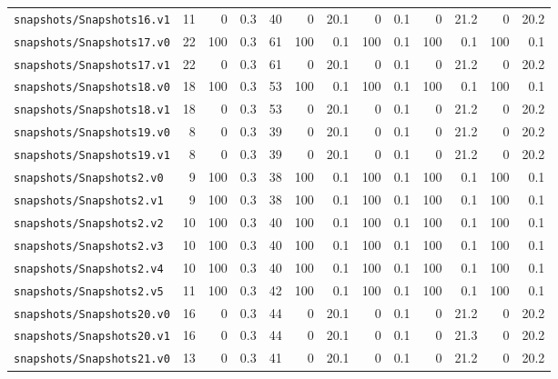 \documentclass[a4paper,final]{llncs}
\begin{document}
\begin{scriptsize}
\begin{longtable}{l |r *{1}{rr} |r *{4}{rr}}
\verb|snapshots/Snapshots16.v1|  &  11  &  0  &  0.3  &  40  &  0  &  20.1  &  0  &  0.1  &  0  &  21.2  &  0  &  20.2  \\
\verb|snapshots/Snapshots17.v0|  &  22  &  100  &  0.3  &  61  &  100  &  0.1  &  100  &  0.1  &  100  &  0.1  &  100  &  0.1  \\
\verb|snapshots/Snapshots17.v1|  &  22  &  0  &  0.3  &  61  &  0  &  20.1  &  0  &  0.1  &  0  &  21.2  &  0  &  20.2  \\
\verb|snapshots/Snapshots18.v0|  &  18  &  100  &  0.3  &  53  &  100  &  0.1  &  100  &  0.1  &  100  &  0.1  &  100  &  0.1  \\
\verb|snapshots/Snapshots18.v1|  &  18  &  0  &  0.3  &  53  &  0  &  20.1  &  0  &  0.1  &  0  &  21.2  &  0  &  20.2  \\
\verb|snapshots/Snapshots19.v0|  &  8  &  0  &  0.3  &  39  &  0  &  20.1  &  0  &  0.1  &  0  &  21.2  &  0  &  20.2  \\
\verb|snapshots/Snapshots19.v1|  &  8  &  0  &  0.3  &  39  &  0  &  20.1  &  0  &  0.1  &  0  &  21.2  &  0  &  20.2  \\
\verb|snapshots/Snapshots2.v0|  &  9  &  100  &  0.3  &  38  &  100  &  0.1  &  100  &  0.1  &  100  &  0.1  &  100  &  0.1  \\
\verb|snapshots/Snapshots2.v1|  &  9  &  100  &  0.3  &  38  &  100  &  0.1  &  100  &  0.1  &  100  &  0.1  &  100  &  0.1  \\
\verb|snapshots/Snapshots2.v2|  &  10  &  100  &  0.3  &  40  &  100  &  0.1  &  100  &  0.1  &  100  &  0.1  &  100  &  0.1  \\
\verb|snapshots/Snapshots2.v3|  &  10  &  100  &  0.3  &  40  &  100  &  0.1  &  100  &  0.1  &  100  &  0.1  &  100  &  0.1  \\
\verb|snapshots/Snapshots2.v4|  &  10  &  100  &  0.3  &  40  &  100  &  0.1  &  100  &  0.1  &  100  &  0.1  &  100  &  0.1  \\
\verb|snapshots/Snapshots2.v5|  &  11  &  100  &  0.3  &  42  &  100  &  0.1  &  100  &  0.1  &  100  &  0.1  &  100  &  0.1  \\
\verb|snapshots/Snapshots20.v0|  &  16  &  0  &  0.3  &  44  &  0  &  20.1  &  0  &  0.1  &  0  &  21.2  &  0  &  20.2  \\
\verb|snapshots/Snapshots20.v1|  &  16  &  0  &  0.3  &  44  &  0  &  20.1  &  0  &  0.1  &  0  &  21.3  &  0  &  20.2  \\
\verb|snapshots/Snapshots21.v0|  &  13  &  0  &  0.3  &  41  &  0  &  20.1  &  0  &  0.1  &  0  &  21.2  &  0  &  20.2  \\

\end{longtable}
\end{scriptsize}
\end{document}
